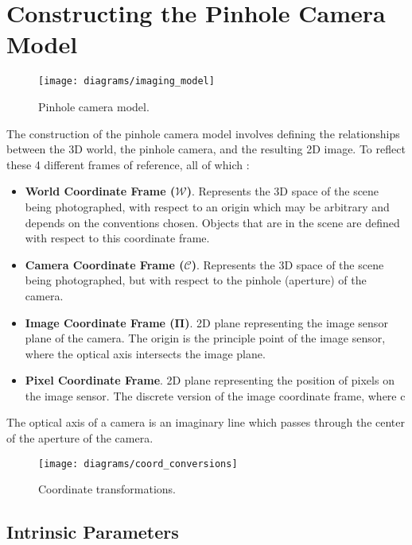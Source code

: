 \section{Constructing the Pinhole Camera Model}

\begin{figure}[H]
    \centering
    \texttt{[image: diagrams/imaging\_model]}
    \caption{Pinhole camera model.}
\end{figure}

The construction of the pinhole camera model involves defining the relationships between the 3D world, the pinhole camera, and the resulting 2D image. To reflect these  4 different frames of reference, all of which :
\begin{itemize}[leftmargin=!, itemindent=-4ex]
    \item\textbf{World Coordinate Frame ($\boldsymbol{\mathcal{W}}$)}. Represents the 3D space of the scene being photographed, with respect to an origin which may be arbitrary and depends on the conventions chosen. Objects that are in the scene are defined with respect to this coordinate frame.
    \item\textbf{Camera Coordinate Frame ($\boldsymbol{\mathcal{C}}$)}. Represents the 3D space of the scene being photographed, but with respect to the pinhole (aperture) of the camera.
    \item\textbf{Image Coordinate Frame ($\boldsymbol{\Pi}$)}. 2D plane representing the image sensor plane of the camera. The origin is the principle point of the image sensor, where the optical axis intersects the image plane.
    \item\textbf{Pixel Coordinate Frame}. 2D plane representing the position of pixels on the image sensor. The discrete version of the image coordinate frame, where c
\end{itemize}

The optical axis of a camera is an imaginary line which passes through the center of the aperture of the camera.



\begin{figure}[H]
    \centering
    \texttt{[image: diagrams/coord\_conversions]}
    \caption{Coordinate transformations.}
\end{figure}


\subsection{Intrinsic Parameters} \label{sec:intrinsics}

